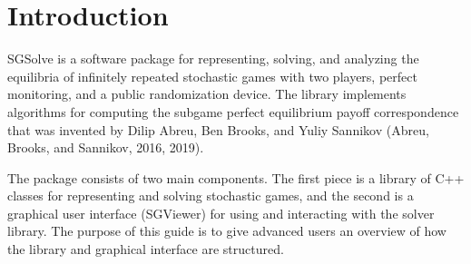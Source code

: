 \hypertarget{index_introsec}{}\section{Introduction}\label{index_introsec}
S\+G\+Solve is a software package for representing, solving, and analyzing the equilibria of infinitely repeated stochastic games with two players, perfect monitoring, and a public randomization device. The library implements algorithms for computing the subgame perfect equilibrium payoff correspondence that was invented by Dilip Abreu, Ben Brooks, and Yuliy Sannikov (Abreu, Brooks, and Sannikov, 2016, 2019).

The package consists of two main components. The first piece is a library of C++ classes for representing and solving stochastic games, and the second is a graphical user interface (S\+G\+Viewer) for using and interacting with the solver library. The purpose of this guide is to give advanced users an overview of how the library and graphical interface are structured.

